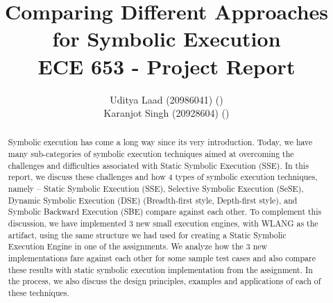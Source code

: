 \documentclass[11pt]{llncs}
\begin{document}
%
\title{Comparing Different Approaches for Symbolic Execution\\ ECE 653 - Project Report}
%
%
\author{Uditya Laad (20986041) ()
\\Karanjot Singh (20928604) ()}
%
%

%
\maketitle              %
%

\vspace{-6mm}


\begin{abstract}
	Symbolic execution has come a long way since its very introduction. Today, we have many sub-categories of symbolic execution techniques aimed at overcoming the challenges and difficulties associated with Static Symbolic Execution (SSE). In this report, we discuss these challenges and how 4 types of symbolic execution techniques, namely – Static Symbolic Execution (SSE), Selective Symbolic Execution (SeSE), Dynamic Symbolic Execution (DSE) (Breadth-first style, Depth-first style), and Symbolic Backward Execution (SBE) compare against each other. To complement this discussion, we have implemented 3 new small execution engines, with WLANG as the artifact, using the same structure we had used for creating a Static Symbolic Execution Engine in one of the assignments. We analyze how the 3 new implementations fare against each other for some sample test cases and also compare these results with static symbolic execution implementation from the assignment. In the process, we also discuss the design principles, examples and applications of each of these techniques.

\end{abstract}
\end{document}
